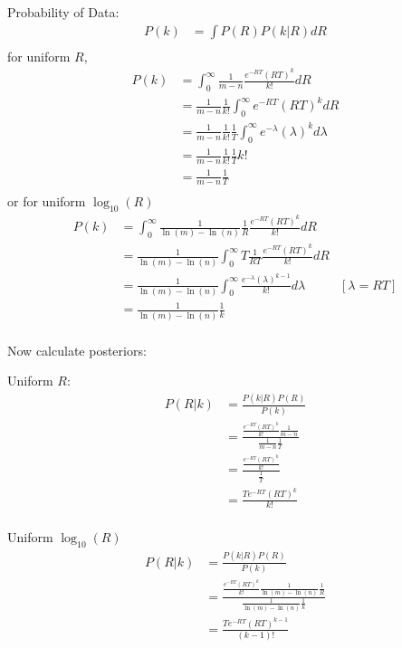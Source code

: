 \begin{enumerate}[label=\textbf{\Alph*}.]
    Probability of Data:
    \begin{align*}
        P(k) &= \int P(R) P(k|R) dR \\
    \end{align*}
    for uniform $R$,
    \begin{align*}
        P(k) &= \int_0^\infty \frac{1}{m-n} \frac{e^{-RT}(RT)^k}{k!} dR \\
        &= \frac{1}{m-n}\frac{1}{k!} \int_0^\infty e^{-RT}(RT)^k dR \\
        &= \frac{1}{m-n}\frac{1}{k!}\frac{1}{T} \int_0^\infty e^{-\lambda}(\lambda)^k d\lambda \\
        &= \frac{1}{m-n}\frac{1}{k!}\frac{1}{T} k! \\
        &= \frac{1}{m-n}\frac{1}{T} \\
    \end{align*}
    or for uniform $\log_{10}(R)$
    \begin{align*}
        P(k) &= \int_0^\infty \frac{1}{\ln(m)-\ln(n)}\frac{1}{R} \frac{e^{-RT}(RT)^k}{k!} dR \\
        &= \frac{1}{\ln(m)-\ln(n)} \int_0^\infty T \frac{1}{RT} \frac{e^{-RT}(RT)^k}{k!} dR \\
        &= \frac{1}{\ln(m)-\ln(n)} \int_0^\infty \frac{e^{-\lambda}(\lambda)^{k-1}}{k!} d\lambda &[\lambda = RT]\\
        &= \frac{1}{\ln(m)-\ln(n)}\frac{1}{k} \\
    \end{align*}
    
    Now calculate posteriors:

    Uniform $R$:
    \begin{align*}
        P(R|k) &= \frac{P(k|R)P(R)}{P(k)}\\
        &= \frac{\frac{e^{-RT}(RT)^k}{k!}\frac{1}{m-n}}{\frac{1}{m-n}\frac{1}{T}}\\
        &= \frac{\frac{e^{-RT}(RT)^k}{k!}}{\frac{1}{T}}\\
        &= \frac{Te^{-RT}(RT)^k}{k!}\\
    \end{align*}

    Uniform $\log_{10}(R)$
    \begin{align*}
        P(R|k) &= \frac{P(k|R)P(R)}{P(k)}\\
        &= \frac{\frac{e^{-RT}(RT)^k}{k!}\frac{1}{\ln(m)-\ln(n)} \frac{1}{R}}{\frac{1}{\ln(m)-\ln(n)}\frac{1}{k}}\\
        &= \frac{Te^{-RT}(RT)^{k-1}}{(k-1)!}\\
    \end{align*}


\end{enumerate}
